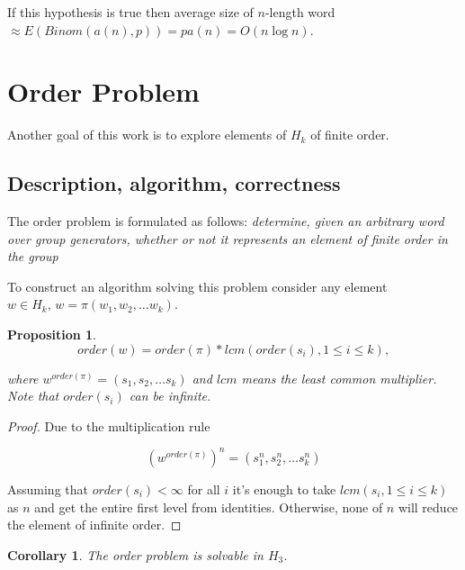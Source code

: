 \documentclass[a4paper,12pt]{amsart}
\newtheorem{corollary}{Corollary}
\newtheorem{proposition}{Proposition}
\begin{document}
If this hypothesis is true then average size of $n$-length word $\approx E(Binom(a(n), p)) = p a(n) = O(n \log n)$. 

\section{Order Problem}

Another goal of this work is to explore elements of $H_k$ of finite order. 

\subsection{Description, algorithm, correctness}

The order problem is formulated as follows: \textit{determine, given an arbitrary word over group generators, whether or not it represents an element of finite order in the group}

To construct an algorithm solving this problem consider any element $w \in H_k, \, w = \pi (w_1, w_2, \dots w_k)$.

\begin{proposition}
	\begin{equation}
		\label{order}
		order(w) = order(\pi) * lcm(order(s_i), 1 \le i \le k),
	\end{equation}
	
	where $w^{order(\pi)} = (s_1, s_2, \dots s_k)$ and $lcm$ means the least common multiplier. Note that $order(s_i)$ can be infinite. 
\end{proposition}

\begin{proof}
	Due to the multiplication rule
	
	$$(w^{order(\pi)})^n = (s_1^n, s_2^n, \dots s_k^n)$$
	
	Assuming that $order(s_i) < \infty$ for all $i$ it's enough to take $lcm(s_i, 1 \le i \le k)$ as $n$ and get the entire first level from identities. Otherwise, none of $n$ will reduce the element of infinite order. 
\end{proof}

\begin{corollary}
	\label{corollary:solvable}
	The order problem is solvable in $H_3$.
\end{corollary}
\end{document}
